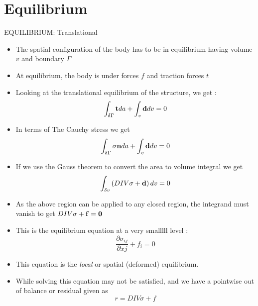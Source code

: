 	\section{Equilibrium}
	\begin{frame}{EQUILIBRIUM: Translational}
		\begin{itemize}
			\item The spatial configuration of the body has to be in equilibrium having volume $v$ and boundary $\Gamma$
			\item 	At equilibrium, the body is under forces $f$ and traction forces $t$
			\item 	Looking at the translational equilibrium of the structure, we get :
			\begin{equation}
				\int_{\delta \Gamma} \mathbf{t} da + \int_{v} \mathbf{d} dv = 0
			\end{equation}
			\item In terms of The Cauchy stress we get
			\begin{equation}
				\int_{\delta \Gamma} \mathbf{\sigma n} da + \int_{v} \mathbf{d} dv = 0
			\end{equation}
			\item If we use the Gauss theorem to convert the area to volume integral we get
			\begin{equation}
					\int_{\delta v} \left( DIV\mathbf{\sigma} + \mathbf{d}\right) dv = 0
			\end{equation}
			\item As the above region can be applied to any closed region, the integrand must vanish to get $DIV \mathbf{\sigma + f = 0}$
		\end{itemize}
	\end{frame}
	
	\begin{frame}
		\begin{itemize}
			\item This is the equilibrium equation at a very smalllll level :
			\begin{equation}
				\frac{\partial \sigma_{ij}}{\partial xj} + f_i = 0
			\end{equation}
			\item This equation is the \textit{local} or spatial (deformed) equilibrium. 
			\item While solving this equation may not be satisfied, and we have a pointwise out of balance or residual given as
			\begin{equation}
				r = DIV \sigma + f
			\end{equation}
			
		\end{itemize}
	\end{frame}

